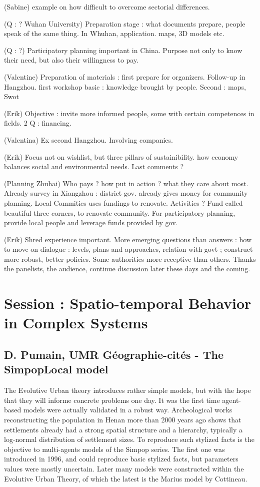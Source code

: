 \documentclass[11pt]{article}
\begin{document}
(Sabine) example on how difficult to overcome sectorial differences.

(Q : ? Wuhan University) Preparation stage : what documents prepare, people speak of the same thing. In Whuhan, application. maps, 3D models etc.

(Q : ?) Participatory planning important in China. Purpose not only to know their need, but also their willingness to pay.

(Valentine) Preparation of materials : first prepare for organizers. Follow-up in Hangzhou. first workshop basic : knowledge brought by people. Second : maps, Swot

(Erik) Objective : invite more informed people, some with certain competences in fields. 2 Q : financing.

(Valentina) Ex second Hangzhou. Involving companies. 

(Erik) Focus not on wishlist, but three pillars of sustainibility. how economy balances social and environmental needs. Last comments ?

(Planning Zhuhai) Who pays ? how put in action ? what they care about most. Already survey in Xiangzhou : district gov. already gives money for community planning. Local Commities uses fundings to renovate. Activities ? Fund called beautiful three corners, to renovate community. For participatory planning, provide local people and leverage funds provided by gov.

(Erik) Shred experience important. More emerging questions than answers : how to move on dialogue : levels, plans and approaches, relation with govt ; construct more robust, better policies. Some authorities more receptive than others.
Thanks the panelists, the audience, continue discussion later these days and the coming.





\section*{Session : Spatio-temporal Behavior in Complex Systems}

\subsection*{D. Pumain, UMR Géographie-cités - The SimpopLocal model}


The Evolutive Urban theory introduces rather simple models, but with the hope that they will informe concrete problems one day. It was the first time agent-based models were actually validated in a robust way. Archeological works reconstructing the population in Henan more than 2000 years ago shows that settlements already had a strong spatial structure and a hierarchy, typically a log-normal distribution of settlement sizes. To reproduce such stylized facts is the objective to multi-agents models of the Simpop series. The first one was introduced in 1996, and could reproduce basic stylized facts, but parameters values were mostly uncertain. Later many models were constructed within the Evolutive Urban Theory, of which the latest is the Marius model by Cottineau.
\end{document}
